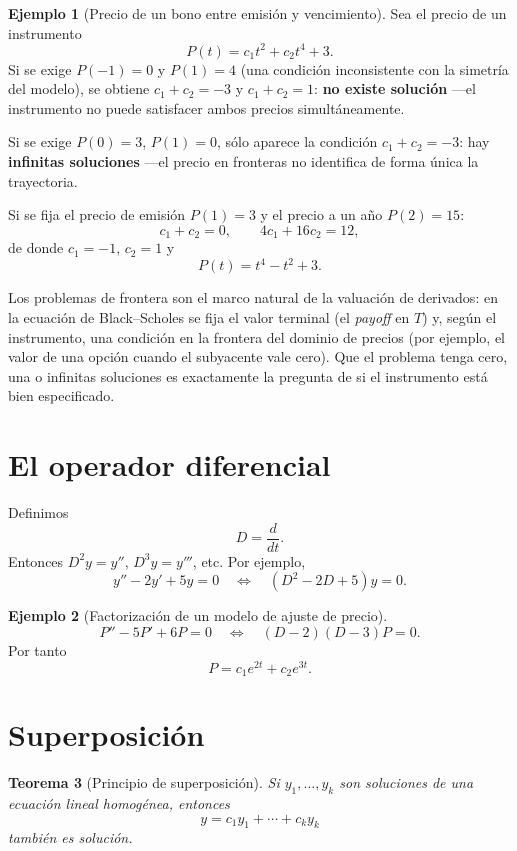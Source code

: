 \documentclass[11pt]{article}
\newtheorem{teorema}{Teorema}[section]
\theoremstyle{definition}
\newtheorem{ejemplo}[teorema]{Ejemplo}
\begin{document}
\begin{ejemplo}[Precio de un bono entre emisión y vencimiento]
Sea el precio de un instrumento
\[
P(t)=c_1t^2+c_2t^4+3.
\]
Si se exige $P(-1)=0$ y $P(1)=4$ (una condición inconsistente con la simetría del
modelo), se obtiene $c_1+c_2=-3$ y $c_1+c_2=1$: \textbf{no existe solución} —el
instrumento no puede satisfacer ambos precios simultáneamente.

Si se exige $P(0)=3$, $P(1)=0$, sólo aparece la condición $c_1+c_2=-3$: hay
\textbf{infinitas soluciones} —el precio en fronteras no identifica de forma única la
trayectoria.

Si se fija el precio de emisión $P(1)=3$ y el precio a un año $P(2)=15$:
\[
c_1+c_2=0,\qquad 4c_1+16c_2=12,
\]
de donde $c_1=-1$, $c_2=1$ y
\[
\boxed{P(t)=t^4-t^2+3}.
\]
\end{ejemplo}

\begin{finanzas}
Los problemas de frontera son el marco natural de la valuación de derivados: en la
ecuación de Black--Scholes se fija el valor terminal (el \emph{payoff} en $T$) y, según
el instrumento, una condición en la frontera del dominio de precios (por ejemplo, el
valor de una opción cuando el subyacente vale cero). Que el problema tenga cero, una o
infinitas soluciones es exactamente la pregunta de si el instrumento está bien
especificado.
\end{finanzas}

\section{El operador diferencial}
Definimos
\[
D=\frac{d}{dt}.
\]
Entonces $D^2y=y''$, $D^3y=y'''$, etc. Por ejemplo,
\[
y''-2y'+5y=0
\quad\Longleftrightarrow\quad
(D^2-2D+5)y=0.
\]

\begin{ejemplo}[Factorización de un modelo de ajuste de precio]
\[
P''-5P'+6P=0
\quad\Longleftrightarrow\quad
(D-2)(D-3)P=0.
\]
Por tanto
\[
\boxed{P=c_1e^{2t}+c_2e^{3t}}.
\]
\end{ejemplo}

\section{Superposición}
\begin{teorema}[Principio de superposición]
Si $y_1,\ldots,y_k$ son soluciones de una ecuación lineal homogénea, entonces
\[
y=c_1y_1+\cdots+c_ky_k
\]
también es solución.
\end{teorema}
\end{document}
